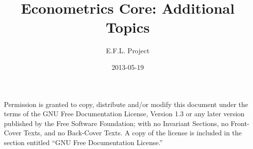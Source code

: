 \documentclass[nofonts]{tufte-latex/tufte-handout}
\title{Econometrics Core: Additional Topics}
\author{E.F.L. Project}
\date{2013-05-19}
\begin{document}
\maketitle
\tableofcontents

  Permission is granted to
copy, distribute and/or modify this document under the terms of the
GNU Free Documentation License, Version 1.3 or any later version
published by the Free Software Foundation; with no Invariant Sections,
no Front-Cover Texts, and no Back-Cover Texts.  A copy of the license
is included in the section entitled ``GNU Free Documentation
License.''





\appendix

\end{document}
